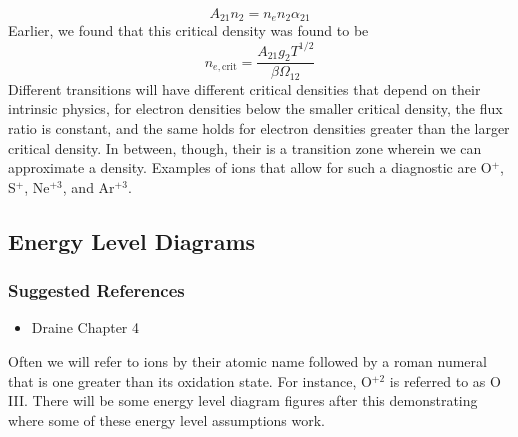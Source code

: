 \documentclass[10pt]{article}
\numberwithin{equation}{section}
\begin{document}
\begin{equation}
  \label{eq:three:22} A_{21} n_2 = n_e n_2 \alpha_{21}
\end{equation}
Earlier, we found that this critical density was found to be
\begin{equation}
  \label{eq:three:23} n_{e, \mathrm{crit}} = \frac{A_{21}g_2 T^{1/2}}{\beta \Omega_{12}}
\end{equation}
Different transitions will have different critical densities that depend on their intrinsic physics, for electron densities below the smaller critical density, the flux ratio is constant, and the same holds for electron densities greater than the larger critical density. In between, though, their is a transition zone wherein we can approximate a density. Examples of ions that allow for such a diagnostic are O$^+$, S$^+$, Ne$^{+3}$, and Ar$^{+3}$.
\subsection{Energy Level Diagrams} %
\subsubsection*{Suggested References} %
\label{ssub:suggested_references}
\begin{itemize}
  \item Draine Chapter 4
\end{itemize}
\label{sub:energy_level_diagrams}
Often we will refer to ions by their atomic name followed by a roman numeral
that is one greater than its oxidation state. For instance, O$^{+2}$ is
referred to as O\,III.
There will be some energy level diagram figures after this demonstrating where
some of these energy level assumptions work.\\
\end{document}
